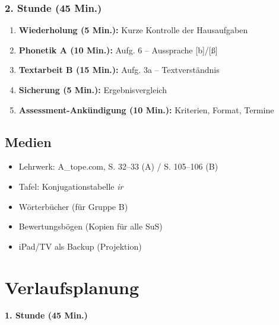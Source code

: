 \documentclass[11pt,a4paper]{article}
\begin{document}
\subsubsection{2. Stunde (45 Min.)}
\begin{enumerate}
    \item \textbf{Wiederholung (5 Min.):} Kurze Kontrolle der Hausaufgaben
    \item \textbf{Phonetik A (10 Min.):} Aufg. 6 -- Aussprache [b]/[\ss]
    \item \textbf{Textarbeit B (15 Min.):} Aufg. 3a -- Textverständnis
    \item \textbf{Sicherung (5 Min.):} Ergebnisvergleich
    \item \textcolor{fach}{\textbf{Assessment-Ankündigung (10 Min.):}} Kriterien, Format, Termine
\end{enumerate}

\subsection{Medien}
\begin{itemize}
    \item Lehrwerk: A\_tope.com, S. 32--33 (A) / S. 105--106 (B)
    \item Tafel: Konjugationstabelle \textit{ir}
    \item Wörterbücher (für Gruppe B)
    \item Bewertungsbögen (Kopien für alle SuS)
    \item iPad/TV als Backup (Projektion)
\end{itemize}

\section{Verlaufsplanung}

\textbf{1. Stunde (45 Min.)}
\end{document}
